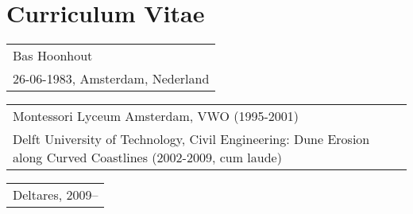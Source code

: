 \chapter*{Curriculum Vitae}

\noindent {}

\begin{table}[h]
  \def\arraystretch{1.5}
  \begin{tabular}{p{10cm}}
    Bas Hoonhout \\
    26-06-1983, Amsterdam, Nederland \\
  \end{tabular}
\end{table}

\noindent {}

\begin{table}[h]
  \def\arraystretch{1.5}
  \begin{tabular}{p{10cm}}
    Montessori Lyceum Amsterdam, VWO (1995-2001) \\
    Delft University of Technology, Civil Engineering: Dune Erosion along Curved Coastlines (2002-2009, cum laude) \\
  \end{tabular}
\end{table}

\noindent {}

\begin{table}[h]
  \def\arraystretch{1.5}
  \begin{tabular}{p{10cm}}
    Deltares, 2009– \\
  \end{tabular}
\end{table}

